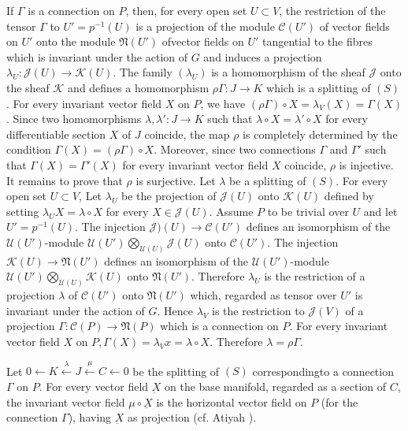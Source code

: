 If $\Gamma$ is a connection on $P$, then, for every open set $U
\subset V$, the restriction of the tensor $\Gamma$ to $U' = p^{-1}
(U)$ is a projection of the module $\mathscr{C}(U')$ of vector fields
on $U '$ onto the module $\mathfrak{N}(U')$ of\pageoriginale vector fields on $U'$
tangential to the fibres which is invariant under the action of $G$
and induces a projection $\lambda_U : \mathcal{J} (U) \to \mathscr{K}
(U)$. The family $(\lambda_U)$ is a homomorphism of the sheaf
$\mathcal{J}$ onto the sheaf $\mathscr{K}$ and defines a homomorphism
$\rho \Gamma : J \to K$ which is a splitting of $(S)$. For every
invariant vector field $X$ on $P$, we have $(\rho \Gamma) \circ X =
\lambda_V (X) = \Gamma (X)$. Since two homomorphisms $\lambda,
\lambda' : J \to K$ such that $\lambda \circ X = \lambda' \circ X$ for every
differentiable section $X$ of $J$ coincide, the map $\rho$ is
completely determined by the condition $\Gamma (X) = (\rho \Gamma) \circ
X$. Moreover, since two connections $\Gamma$ and $\Gamma '$ such that
$\Gamma(X) = \Gamma '(X)$ for every invariant vector field $X$
coincide, $\rho$ is injective. It remains to prove that $\rho$ is
surjective. Let $\lambda$ be a splitting of $(S)$. For every open set
$U \subset V$, Let $\lambda_U$ be the projection of $\mathcal{J} (U)$
onto $\mathscr{K} (U)$ defined by setting $\lambda_U X = \lambda \circ X$
for every $X \in \mathcal{J} (U)$. Assume $P$ to be trivial over $U$
and let $U' = p^{-1} (U)$. The injection $\mathcal{J} )(U) \to
\mathscr{C} (U')$ defines an isomorphism of the $\mathscr{U} (U
')$-module $\mathscr{U}(U') \bigotimes \limits_{\mathscr{U}(U)}
\mathcal{J} (U)$ onto $\mathscr{C}(U')$. The injection $\mathscr{K}
(U) \to \mathfrak{N} (U')$ defines an isomorphism of the $\mathscr{U}(U
')$-module $\mathscr{U} (U ') \bigotimes\limits_{\mathscr{U}(U)}
\mathscr{K} (U)$ onto
$\mathfrak{N} (U')$. Therefore $\lambda_U$ is the restriction of a
projection $\lambda$ of $\mathscr{C}(U')$ onto $\mathfrak{N} (U')$
which, regarded as tensor over $U'$ is invariant under the action of
$G$. Hence $\lambda_V$ is the restriction to $\mathcal{J}(V)$ of a
projection $\Gamma : \mathscr{C} (P) \to \mathfrak{N} (P)$ which is a
connection on $P$. For every invariant vector field $X$ on $P, \Gamma
(X) = \lambda_V x = \lambda \circ X$. Therefore $\lambda = \rho \Gamma$. 

\begin{remark*}%
  Let $0 \leftarrow K \xleftarrow{\lambda} J \xleftarrow{\mu} C
  \leftarrow 0$ be the splitting of $(S)$ corresponding\pageoriginale to a
  connection $\Gamma$ on $P$. For every vector field $\underbar{X}$ on
  the base manifold, regarded as a section of $C$, the invariant
  vector field $\mu \circ \underbar{X}$ is the horizontal vector field on
  $P$ (for the connection $\Gamma$), having $\underbar{X}$ as
  projection (cf. Atiyah \cite{2}). 
\end{remark*}

